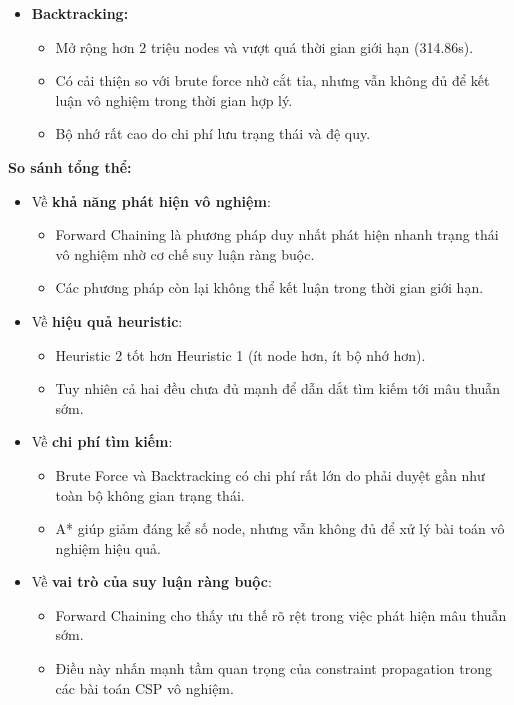 \begin{itemize}
\item \textbf{Backtracking:}
\begin{itemize}
    \item Mở rộng hơn 2 triệu nodes và vượt quá thời gian giới hạn (314.86s).
    \item Có cải thiện so với brute force nhờ cắt tỉa, nhưng vẫn không đủ để kết luận vô nghiệm trong thời gian hợp lý.
    \item Bộ nhớ rất cao do chi phí lưu trạng thái và đệ quy.
\end{itemize}

\end{itemize}

\textbf{So sánh tổng thể:}

\begin{itemize}
    \item Về \textbf{khả năng phát hiện vô nghiệm}:
    \begin{itemize}
        \item Forward Chaining là phương pháp duy nhất phát hiện nhanh trạng thái vô nghiệm nhờ cơ chế suy luận ràng buộc.
        \item Các phương pháp còn lại không thể kết luận trong thời gian giới hạn.
    \end{itemize}
    
    \item Về \textbf{hiệu quả heuristic}:
    \begin{itemize}
        \item Heuristic 2 tốt hơn Heuristic 1 (ít node hơn, ít bộ nhớ hơn).
        \item Tuy nhiên cả hai đều chưa đủ mạnh để dẫn dắt tìm kiếm tới mâu thuẫn sớm.
    \end{itemize}
    
    \item Về \textbf{chi phí tìm kiếm}:
    \begin{itemize}
        \item Brute Force và Backtracking có chi phí rất lớn do phải duyệt gần như toàn bộ không gian trạng thái.
        \item A* giúp giảm đáng kể số node, nhưng vẫn không đủ để xử lý bài toán vô nghiệm hiệu quả.
    \end{itemize}
    
    \item Về \textbf{vai trò của suy luận ràng buộc}:
    \begin{itemize}
        \item Forward Chaining cho thấy ưu thế rõ rệt trong việc phát hiện mâu thuẫn sớm.
        \item Điều này nhấn mạnh tầm quan trọng của constraint propagation trong các bài toán CSP vô nghiệm.
    \end{itemize}
\end{itemize}

